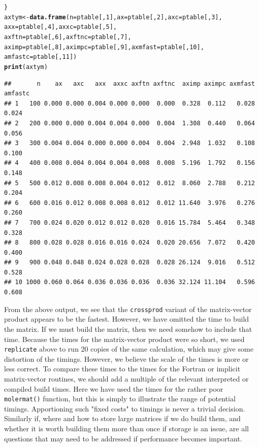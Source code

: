\documentclass[10pt]{article}\usepackage[]{graphicx}\usepackage[]{color}
\makeatletter
\newcommand{\hlnum}[1]{\textcolor[rgb]{0.686,0.059,0.569}{#1}}%
\newcommand{\hlstd}[1]{\textcolor[rgb]{0.345,0.345,0.345}{#1}}%
\newcommand{\hlkwb}[1]{\textcolor[rgb]{0.69,0.353,0.396}{#1}}%
\newcommand{\hlkwc}[1]{\textcolor[rgb]{0.333,0.667,0.333}{#1}}%
\newcommand{\hlkwd}[1]{\textcolor[rgb]{0.737,0.353,0.396}{\textbf{#1}}}%
\newenvironment{kframe}{%
 \def\at@end@of@kframe{}%
 \ifinner\ifhmode%
  \def\at@end@of@kframe{\end{minipage}}%
  \begin{minipage}{\columnwidth}%
 \fi\fi%
 \def\FrameCommand##1{\hskip\@totalleftmargin \hskip-\fboxsep
 \colorbox{shadecolor}{##1}\hskip-\fboxsep
     \hskip-\linewidth \hskip-\@totalleftmargin \hskip\columnwidth}%
 \MakeFramed {\advance\hsize-\width
   \@totalleftmargin\z@ \linewidth\hsize
   \@setminipage}}%
 {\par\unskip\endMakeFramed%
 \at@end@of@kframe}
\newenvironment{knitrout}{}{} %
\newcommand{\code}[1]{{\tt #1}}
\makeatother
\begin{document}
\begin{knitrout}
\begin{kframe}
\begin{alltt}
\hlstd{\}}
\hlstd{axtym}\hlkwb{<-}\hlkwd{data.frame}\hlstd{(}\hlkwc{n}\hlstd{=ptable[,}\hlnum{1}\hlstd{],} \hlkwc{ax}\hlstd{=ptable[,}\hlnum{2}\hlstd{],} \hlkwc{axc}\hlstd{=ptable[,}\hlnum{3}\hlstd{],}
  \hlkwc{axx}\hlstd{=ptable[,}\hlnum{4}\hlstd{],} \hlkwc{axxc}\hlstd{=ptable[,}\hlnum{5}\hlstd{],}
  \hlkwc{axftn}\hlstd{=ptable[,}\hlnum{6}\hlstd{],} \hlkwc{axftnc}\hlstd{=ptable[,}\hlnum{7}\hlstd{],}
  \hlkwc{aximp}\hlstd{=ptable[,}\hlnum{8}\hlstd{],} \hlkwc{aximpc}\hlstd{=ptable[,}\hlnum{9}\hlstd{],} \hlkwc{axmfast}\hlstd{=ptable[,}\hlnum{10}\hlstd{],}
  \hlkwc{amfastc}\hlstd{=ptable[,}\hlnum{11}\hlstd{])}
\hlkwd{print}\hlstd{(axtym)}
\end{alltt}
\begin{verbatim}
##       n    ax   axc   axx  axxc axftn axftnc  aximp aximpc axmfast amfastc
## 1   100 0.000 0.000 0.004 0.000 0.000  0.000  0.328  0.112   0.028   0.024
## 2   200 0.000 0.000 0.004 0.004 0.000  0.004  1.308  0.440   0.064   0.056
## 3   300 0.004 0.004 0.000 0.000 0.004  0.004  2.948  1.032   0.108   0.100
## 4   400 0.008 0.004 0.004 0.004 0.008  0.008  5.196  1.792   0.156   0.148
## 5   500 0.012 0.008 0.008 0.004 0.012  0.012  8.060  2.788   0.212   0.204
## 6   600 0.016 0.012 0.008 0.008 0.012  0.012 11.640  3.976   0.276   0.260
## 7   700 0.024 0.020 0.012 0.012 0.020  0.016 15.784  5.464   0.348   0.328
## 8   800 0.028 0.028 0.016 0.016 0.024  0.020 20.656  7.072   0.420   0.400
## 9   900 0.048 0.048 0.024 0.028 0.028  0.028 26.124  9.016   0.512   0.528
## 10 1000 0.060 0.064 0.036 0.036 0.036  0.036 32.124 11.104   0.596   0.608
\end{verbatim}
\end{kframe}
\end{knitrout}

From the above output, we see that the \code{crossprod} variant of the 
matrix-vector product appears to be the fastest. However, we have omitted
the time to build the matrix. If we must build the matrix, then we need 
somehow to include that time. Because the times for the matrix-vector 
product were so short, we used \code{replicate} above to run 20 copies 
of the same calculation, which may give some distortion of the timings.
However, we believe the scale of the times is more or less correct. To 
compare these times to the times for the Fortran or implicit matrix-vector
routines, we should add a multiple of the relevant interpreted or
compiled build times. Here we have used the times for the rather poor
\code{molermat()} function, but this is simply to illustrate the range
of potential timings. Apportioning such "fixed costs" to timings is
never a trivial decision. Similarly if, where and how to store
large matrices if we do build them, and whether it is worth building
them more than once if storage is an issue, are all questions that 
may need to be addressed if performance becomes important.
\end{document}
